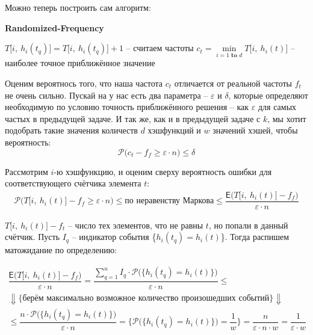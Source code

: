 \documentclass[a4paper,12pt]{article}
\renewcommand{\P}{\mathcal{P}}
\newcommand{\E}{\mathsf{E}}
\begin{document}
Можно теперь построить сам алгоритм:

\begin{algorithm}[H]
    \caption{\textbf{Randomized-Frequency}}
    \begin{algorithmic}[1]
        \Statex
                \State $T\big[i,\ h_i(t_q)\big] = T\big[i,\ h_i(t_q)\big] + 1$ -- считаем частоты
            \EndFor
        \EndFor
        \State\Return $c_t = \min\limits_{i = 1 \textbf{ to }d}T\big[i,\ h_i(t)\big]$ -- наиболее точное приближённое значение
    \end{algorithmic}
\end{algorithm}

Оценим вероятнось того, что наша частота $c_t$ отличается от реальной частоты $f_t$ не очень сильно. Пускай на у нас есть два параметра -- $\varepsilon$ и $\delta$, которые определяют необходимую по  условию точность приближённого решения -- как $\varepsilon$ для самых частых в предыдущей задаче. И так же, как и в предыдущей задаче с $k$, мы хотит подобрать такие значения количеств $d$ хэшфункций и $w$ значений хэшей, чтобы вероятность:
\[\P\big(c_t - f_f \geqslant \varepsilon \cdot n\big) \leqslant \delta\]

Рассмотрим $i$-ю хэшфункцию, и оценим сверху вероятность ошибки для соответствующего счётчика элемента $t$:
\begin{gather*}
    \P\big(T\big[i,\ h_i(t)\big] - f_f \geqslant \varepsilon \cdot n\big) \leqslant \text{по неравенству Маркова} \leqslant \dfrac{\E \big(T\big[i,\ h_i(t)\big] - f_f\big)}{ \varepsilon \cdot n}
\end{gather*}

$T\big[i,\ h_i(t)\big] - f_t$ -- число тех элементов, что не равны $t$, но попали в данный счётчик. Пусть $I_q$ -- индикатор события \{$h_i(t_q) = h_i(t)$\}. Тогда распишем матожидание по определению:

\begin{gather*}
    \dfrac{\E \big(T\big[i,\ h_i(t)\big] - f_f\big)}{ \varepsilon \cdot n} = \dfrac{\sum\limits_{q = 1}^n I_q \cdot \P\big(\{h_i(t_q) = h_i(t)\}\big)}{\varepsilon \cdot n} \leqslant \\ \Downarrow\Big\{\text{берём максимально возможное количество произошедших событий}\Big\} \Downarrow \\
    \leqslant \dfrac{n \cdot \P\big(\{h_i(t_q) = h_i(t)\}\big)}{\varepsilon \cdot n} = \Big\{\P\big(\{h_i(t_q) = h_i(t)\}\big) = \dfrac{1}{w}\Big\}
    = \dfrac{n}{\varepsilon \cdot n \cdot w} = \dfrac{1}{\varepsilon \cdot w}
\end{gather*}
\end{document}
